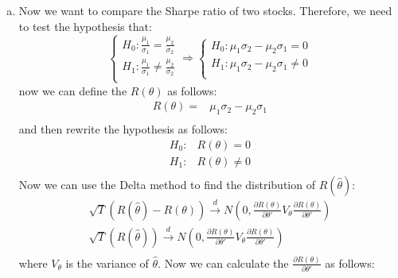 \begin{enumerate}[(a)]
\item  Now we want to compare the Sharpe ratio of two stocks. Therefore, we need to test the hypothesis that:
\begin{equation*}
  \begin{cases}
    H_0: \frac{\mu_1}{\sigma_1} = \frac{\mu_2}{\sigma_2} \\
    H_1: \frac{\mu_1}{\sigma_1} \neq \frac{\mu_2}{\sigma_2} \\
  \end{cases} \Rightarrow \begin{cases}
    H_0:  \mu_1\sigma_2 - \mu_2\sigma_1 = 0 \\
    H_1:  \mu_1\sigma_2 - \mu_2\sigma_1 \neq 0 \\
  \end{cases}
\end{equation*}
now we can define the $R(\theta)$ as follows:
\begin{equation*}
  \begin{aligned}
    R(\theta) = & \mu_1\sigma_2 - \mu_2\sigma_1 \\
  \end{aligned}
\end{equation*}
and then rewrite the hypothesis as follows:
\begin{equation*}
  \begin{aligned}
    H_0: & R(\theta) = 0 \\
    H_1: & R(\theta) \neq 0 \\
  \end{aligned}
\end{equation*}
Now we can use the Delta method to find the distribution of $R(\hat{\theta})$:
\begin{equation*}
  \begin{aligned}
    \sqrt{T}(R(\hat{\theta}) - R(\theta)) \xrightarrow{d} N(0,\frac{\partial R(\theta)}{\partial \theta'}V_{\theta}\frac{\partial R(\theta)}{\partial \theta'}) \\
    \sqrt{T}(R(\hat{\theta})) \xrightarrow{d} N(0,\frac{\partial R(\theta)}{\partial \theta'}V_{\theta}\frac{\partial R(\theta)}{\partial \theta'}) \\
  \end{aligned}
\end{equation*}
where $V_{\theta}$ is the variance of $\hat{\theta}$. Now we can calculate the $\frac{\partial R(\theta)}{\partial \theta'}$ as follows:
\begin{equation*}
  \begin{aligned}

\end{aligned}
\end{equation*}
\end{enumerate}

